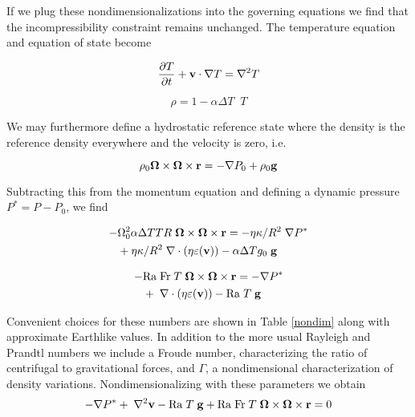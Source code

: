 \documentclass[extra]{gji}
\begin{document}
If we plug these nondimensionalizations into the governing equations we find that the incompressibility constraint remains unchanged.  The temperature equation and equation of state become

\begin{equation}
\frac{\partial T}{\partial t} + {\bf v} \cdot \nabla T = \nabla^2 T
\end{equation}

\begin{equation}
\rho = 1 - \alpha \Delta T \;\;  T
\end{equation}

We may furthermore define a hydrostatic reference state where the density is the reference density everywhere and the velocity is zero, i.e.

\begin{equation}
 \rho_0{\bf \Omega \times \Omega \times r}= - \nabla P_0 + \rho_0 {\bf g}
\label{navier_stokes}
\end{equation}

Subtracting this from the momentum equation and defining a dynamic pressure $P^* = P - P_0$, we find

\begin{equation}
\begin{aligned}
 - & \Omega_0^2  \alpha  \Delta T T R \; {\bf \Omega \times \Omega \times r} = - \eta \kappa / R^2 \; \nabla P^* \\ 
&+ \eta \kappa / R^2 \; \nabla \cdot \left( \eta \varepsilon ({\bf v}) \right) - \alpha \Delta T g_0 \; {\bf g}
\end{aligned}
\end{equation}

\begin{equation}
\begin{aligned}
 - & \mathrm{Ra \; Fr}\; T \; {\bf \Omega \times \Omega \times r} = - \nabla P^* \\ 
&+ \; \nabla \cdot \left( \eta \varepsilon ({\bf v}) \right) - \mathrm{Ra} \; T \; {\bf g}
\end{aligned}
\end{equation}

  
\fi


Convenient choices for these numbers are shown in Table \ref{nondim} along with approximate Earthlike values.
In addition to the more usual Rayleigh and Prandtl numbers we include a Froude number, characterizing the ratio of centrifugal to gravitational forces, and $\Gamma$, a nondimensional characterization of density variations.
Nondimensionalizing with these parameters we obtain
\begin{equation}
\begin{aligned}
 - \nabla P^* + \; \nabla^2{\bf v} - \mathrm{Ra} \; T \; {\bf g} + \mathrm{Ra \; Fr}\; T \;{\bf \Omega \times \Omega \times r} = 0
\end{aligned}
\end{equation}
\end{document}
